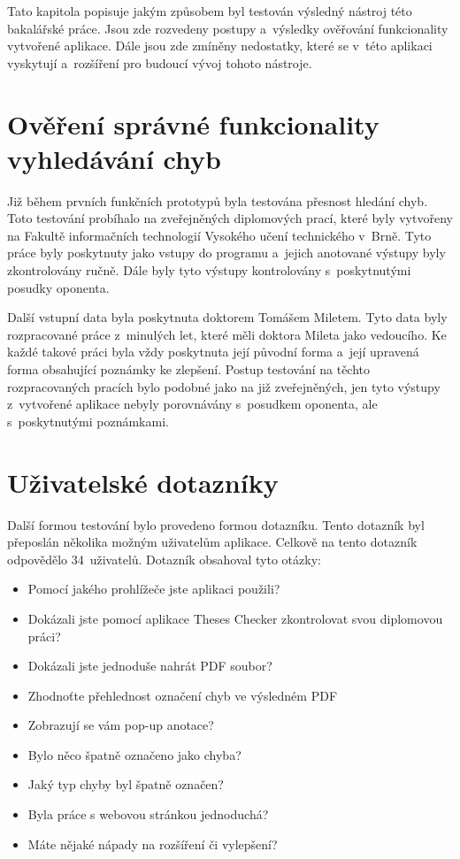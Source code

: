 Tato kapitola popisuje jakým způsobem byl testován výsledný nástroj této
bakalářské práce. Jsou zde rozvedeny postupy a~výsledky ověřování funkcionality
vytvořené aplikace. Dále jsou zde zmíněny nedostatky, které se v~této aplikaci
vyskytují a~rozšíření pro budoucí vývoj tohoto nástroje. 



\section{Ověření správné funkcionality vyhledávání chyb}
Již během prvních funkčních prototypů byla testována přesnost hledání
chyb. Toto testování probíhalo na zveřejněných diplomových prací, které byly
vytvořeny na Fakultě informačních technologií Vysokého učení technického v~Brně.
Tyto práce byly poskytnuty jako vstupy do programu a~jejich anotované
výstupy byly zkontrolovány ručně. Dále byly tyto výstupy kontrolovány
s~poskytnutými posudky oponenta.

Další vstupní data byla poskytnuta doktorem Tomášem Miletem. Tyto data
byly rozpracované práce z~minulých let, které měli doktora Mileta jako
vedoucího. Ke každé takové práci byla vždy poskytnuta její původní forma
a~její upravená forma obsahující poznámky ke zlepšení. Postup testování
na těchto rozpracovaných pracích bylo podobné jako na již zveřejněných, 
jen tyto výstupy z~vytvořené aplikace nebyly porovnávány s~posudkem oponenta,
ale s~poskytnutými poznámkami.



\section{Uživatelské dotazníky}
Další formou testování bylo provedeno formou dotazníku.
Tento dotazník byl přeposlán několika možným uživatelům
aplikace. Celkově na tento dotazník odpovědělo
34~uživatelů. Dotazník obsahoval tyto otázky:
\begin{itemize}
    \item Pomocí jakého prohlížeče jste aplikaci použili?
    \item Dokázali jste pomocí aplikace Theses Checker zkontrolovat svou
    diplomovou práci?
    \item Dokázali jste jednoduše nahrát PDF soubor?
    \item Zhodnoťte přehlednost označení chyb ve výsledném PDF
    \item Zobrazují se vám pop-up anotace?
    \item Bylo něco špatně označeno jako chyba?
    \item Jaký typ chyby byl špatně označen?
    \item Byla práce s webovou stránkou jednoduchá?
    \item Máte nějaké nápady na rozšíření či vylepšení?
\end{itemize}

